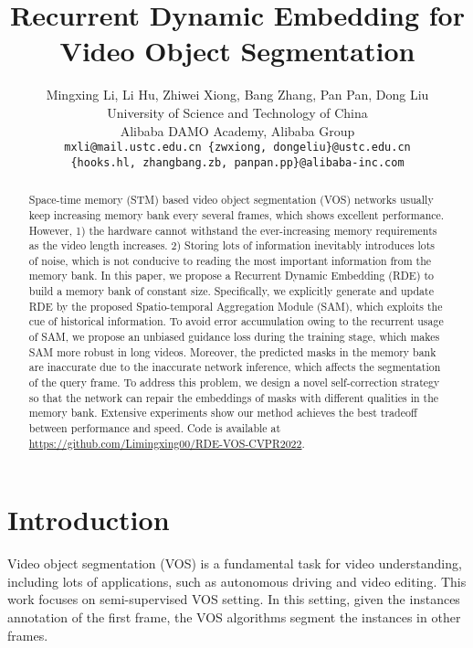 \documentclass[10pt,twocolumn,letterpaper]{article}
\begin{document}
\title{Recurrent Dynamic Embedding for Video Object Segmentation}

\author{
Mingxing Li,
Li Hu,
Zhiwei Xiong,
Bang Zhang,
Pan Pan,
Dong Liu
\\
University of Science and Technology of China \\
Alibaba DAMO Academy, Alibaba Group \\ 
{\tt\small mxli@mail.ustc.edu.cn \{zwxiong, dongeliu\}@ustc.edu.cn}\\
{\tt\small\{hooks.hl, zhangbang.zb, panpan.pp\}@alibaba-inc.com}
}
\maketitle

\begin{abstract}
\renewcommand{\thefootnote}{}
\vspace{-.5em}
Space-time memory (STM) based video object segmentation (VOS) networks usually keep increasing memory bank every several frames, which shows excellent performance. However, 1) the hardware cannot withstand the ever-increasing memory requirements as the video length increases. 2) Storing lots of information inevitably introduces lots of noise, which is not conducive to reading the most important information from the memory bank. In this paper, we propose a Recurrent Dynamic Embedding (RDE) to build a memory bank of constant size. Specifically, we explicitly generate and update RDE by the proposed Spatio-temporal Aggregation Module (SAM), which exploits the cue of historical information. To avoid error accumulation owing to the recurrent usage of SAM, we propose an unbiased guidance loss during the training stage, which makes SAM more robust in long videos. Moreover, the predicted masks in the memory bank are inaccurate due to the inaccurate network inference, which affects the segmentation of the query frame. To address this problem, we design a novel self-correction strategy so that the network can repair the embeddings of masks with different qualities in the memory bank. Extensive experiments show our method achieves the best tradeoff between performance and speed. Code is available 
at \url{https://github.com/Limingxing00/RDE-VOS-CVPR2022}.
\end{abstract}



\section{Introduction\label{sec:intro}}
Video object segmentation (VOS) is a fundamental task for video understanding, including lots of applications, such as autonomous driving and video editing. This work focuses on semi-supervised VOS setting. In this setting, given the instances annotation of the first frame, the VOS algorithms segment the instances in other frames.
\end{document}
